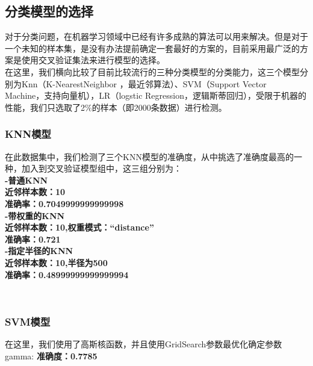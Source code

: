 \documentclass[12pt]{article}
\begin{document}
\newpage
\subsection{分类模型的选择}
\begin{flushleft}
	\noindent\qquad 对于分类问题，在机器学习领域中已经有许多成熟的算法可以用来解决。但是对于一个未知的样本集，是没有办法提前确定一套最好的方案的，目前采用最广泛的方案是使用交叉验证集法来进行模型的选择。\\
	\noindent\qquad 在这里，我们横向比较了目前比较流行的三种分类模型的分类能力，这三个模型分别为Knn（K-NearestNeighbor ，最近邻算法）、SVM（Support Vector Machine，支持向量机），LR（logstic Regression，逻辑斯蒂回归），受限于机器的性能，我们只选取了2$\%$的样本（即2000条数据）进行检测。
\end{flushleft}
\subsubsection{KNN模型}
\begin{flushleft}
	\noindent\qquad 在此数据集中，我们检测了三个KNN模型的准确度，从中挑选了准确度最高的一种，加入到交叉验证模型组中，这三组分别为：\\
	\vspace{1cm}
	\textbf{
	\noindent\qquad-普通KNN\\
	\noindent\qquad\noindent\qquad 近邻样本数：10\\
	\noindent\qquad\noindent\qquad 准确率：0.7049999999999998\\
	\noindent\qquad-带权重的KNN\\
	\noindent\qquad\noindent\qquad 近邻样本数：10,权重模式：“distance”\\
	\noindent\qquad\noindent\qquad 准确率：0.721\\
	\noindent\qquad-指定半径的KNN\\
	\noindent\qquad\noindent\qquad 近邻样本数：10,半径为500\\
	\noindent\qquad\noindent\qquad 准确率：0.48999999999999994\\
}
\end{flushleft}

\
\subsubsection{SVM模型}

\begin{flushleft}
	\noindent\qquad 在这里，我们使用了高斯核函数，并且使用GridSearch参数最优化确定参数gamma:
	\textbf{准确度：0.7785}
	
\end{flushleft}
	\vspace{1cm}
\end{document}
